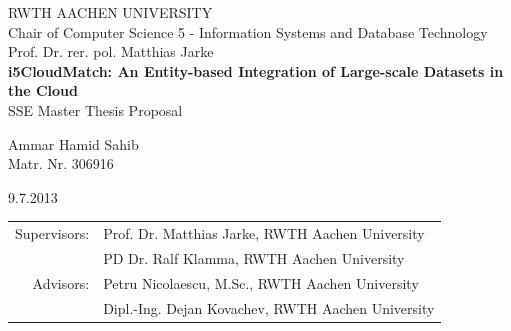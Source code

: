 \begin{center}
RWTH AACHEN UNIVERSITY\\
Chair of Computer Science 5 - Information Systems and Database Technology\\
Prof. Dr. rer. pol. Matthias Jarke\\[30mm]

{\LARGE \textbf{i5CloudMatch: An Entity-based Integration of Large-scale Datasets in the Cloud}\\ [10mm]}
{\LARGE SSE Master Thesis Proposal\\[20mm]}

{\LARGE Ammar Hamid Sahib\\
Matr. Nr. 306916\\ [20mm]}

9.7.2013\\ [20mm]

\begin{tabular}{rl}
Supervisors: & Prof. Dr. Matthias Jarke, RWTH Aachen University\\
             & PD Dr. Ralf Klamma, RWTH Aachen University\\ [5mm]
Advisors: &Petru Nicolaescu, M.Sc., RWTH Aachen University\\
          &Dipl.-Ing. Dejan Kovachev, RWTH Aachen University            
\end{tabular}
\end{center}